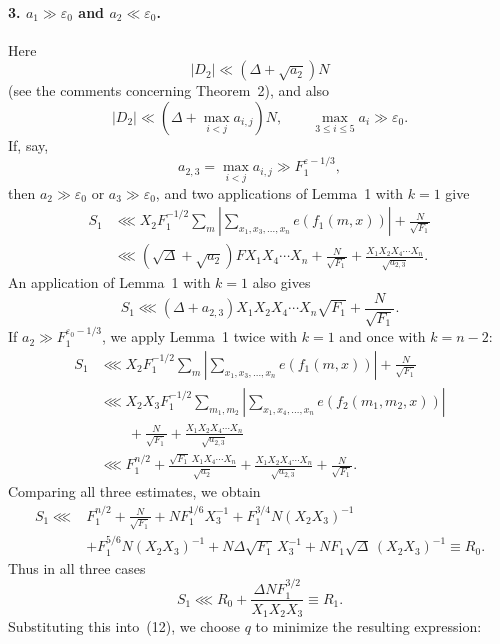 \documentclass[10pt]{article}
\begin{document}
\paragraph{3. $a_1\gg\varepsilon_0$ and $a_2\ll\varepsilon_0$.}
Here
\[
  |D_2|\ll(\Delta+\sqrt{a_2})N
\]
(see the comments concerning Theorem~2), and also
\[
  |D_2|\ll\left(\Delta+\max_{i<j}a_{i,j}\right)N,
  \qquad \max_{3\leqslant i\leqslant5}a_i\gg\varepsilon_0.
\]
If, say,
\[
  a_{2,3}=\max_{i<j}a_{i,j}\gg F_1^{\varepsilon-1/3},
\]
then $a_2\gg\varepsilon_0$ or $a_3\gg\varepsilon_0$, and two applications of Lemma~1 with $k=1$ give
\[
\begin{aligned}
  S_1
  &\lll X_2F_1^{-1/2}\sum_m
    \left|\sum_{x_1,x_3,\ldots,x_n}e(f_1(m,x))\right|
    +\frac{N}{\sqrt{F_1}}\\
  &\lll(\sqrt\Delta+\sqrt{a_2})F X_1X_4\cdots X_n
    +\frac{N}{\sqrt{F_1}}
    +\frac{X_1X_2X_4\cdots X_n}{\sqrt{a_{2,3}}}.
\end{aligned}
\]
An application of Lemma~1 with $k=1$ also gives
\[
  S_1\lll(\Delta+a_{2,3})X_1X_2X_4\cdots X_n\sqrt{F_1}
  +\frac{N}{\sqrt{F_1}}.
\]
If $a_2\gg F_1^{\varepsilon_0-1/3}$, we apply Lemma~1 twice with $k=1$ and once with $k=n-2$:
\[
\begin{aligned}
  S_1
  &\lll X_2F_1^{-1/2}\sum_m
    \left|\sum_{x_1,x_3,\ldots,x_n}e(f_1(m,x))\right|
    +\frac{N}{\sqrt{F_1}}\\
  &\lll X_2X_3F_1^{-1/2}\sum_{m_1,m_2}
    \left|\sum_{x_1,x_4,\ldots,x_n}e(f_2(m_1,m_2,x))\right|\\
  &\qquad+\frac{N}{\sqrt{F_1}}
    +\frac{X_1X_2X_4\cdots X_n}{\sqrt{a_{2,3}}}\\
  &\lll F_1^{n/2}
    +\frac{\sqrt{F_1}\,X_1X_4\cdots X_n}{\sqrt{a_2}}
    +\frac{X_1X_2X_4\cdots X_n}{\sqrt{a_{2,3}}}
    +\frac{N}{\sqrt{F_1}}.
\end{aligned}
\]
Comparing all three estimates, we obtain
\[
\begin{aligned}
  S_1\lll{}&F_1^{n/2}+\frac{N}{\sqrt{F_1}}
  +NF_1^{1/6}X_3^{-1}
  +F_1^{3/4}N(X_2X_3)^{-1}\\
  &+F_1^{5/6}N(X_2X_3)^{-1}
  +N\Delta\sqrt{F_1}\,X_3^{-1}
  +NF_1\sqrt\Delta\,(X_2X_3)^{-1}
  \equiv R_0.
\end{aligned}
\]
Thus in all three cases
\[
  S_1\lll R_0+\frac{\Delta NF_1^{3/2}}{X_1X_2X_3}\equiv R_1.
\]
Substituting this into~(12), we choose $q$ to minimize the resulting expression:
\end{document}

